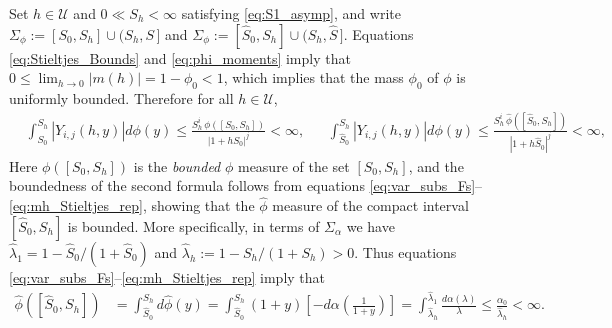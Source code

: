 \documentclass[english,12pt,jmp,graphicx]{revtex4-1}
\newcommand{\ph}{\hat{\phi}}
\begin{document}
Set $h\in\mathcal{U}$ and $0\ll S_h<\infty$ satisfying
\eqref{eq:S1_asymp}, and write $\Sigma_\phi:=[S_0,S_h]\cup(S_h,S\,]$ and
$\Sigma_\phi:=[\hat{S}_0,S_h]\cup(S_h,\hat{S}\,]$. Equations
\eqref{eq:Stieltjes_Bounds} and \eqref{eq:phi_moments} imply that
$0\leq\lim_{h\to0}|m(h)|=1-\phi_0<1$, which implies that the mass $\phi_0$ of $\phi$
is uniformly bounded. Therefore for all $h\in\mathcal{U}$,  
%
\begin{align*}%
  &\int_{S_0}^{S_h}|Y_{i,j}(h,y)| d\phi(y)\leq
  \frac{S_h^i\,\phi([S_0,S_h])}{|1+hS_0|^j}<\infty,
 &&
  \int_{\hat{S}_0}^{S_h}|Y_{i,j}(h,y)| d\phi(y)\leq
  \frac{S_h^i\,\ph([\hat{S}_0,S_h])}{|1+h\hat{S}_0|^j}<\infty,
\end{align*}
%
Here $\phi([S_0,S_h])$ is the \emph{bounded} $\phi$ measure of the set
$[S_0,S_h]$, and the boundedness of the second formula follows from
equations \eqref{eq:var_subs_Fs}--\eqref{eq:mh_Stieltjes_rep}, 
showing that the $\ph$ measure of the compact interval
$[\hat{S}_0,S_h]$ is bounded. More specifically, in terms of
$\Sigma_\alpha$ we have $\hat{\lambda}_1=1-\hat{S}_0/(1+\hat{S}_0)$ and
$\hat{\lambda}_h:=1-S_h/(1+S_h)>0$. Thus equations
\eqref{eq:var_subs_Fs}--\eqref{eq:mh_Stieltjes_rep} imply that 
%
\begin{align*}%
  \ph([\hat{S}_0,S_h])&=\int_{\hat{S}_0}^{S_h}d\ph(y)
         =\int_{\hat{S}_0}^{S_h}(1+y)\left[-d\alpha\left(\frac{1}{1+y}\right)\right]
         =\int_{\hat{\lambda}_h}^{\hat{\lambda}_1}\frac{d\alpha(\lambda)}{\lambda}
         \leq\frac{\alpha_0}{\hat{\lambda}_h}<\infty.
\end{align*}
%
\end{document}
